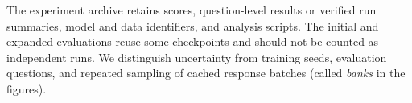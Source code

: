\begin{table}[t]
\caption{\textbf{All eight I64-minus-PG intervals include zero.} Update-500 score differences and nominal 95\% paired question-bootstrap intervals (percentage points).}
\label{tab:endpoint_paired}
\centering\small

\end{table}

The experiment archive retains scores, question-level results or verified run summaries, model and data identifiers, and analysis scripts. The initial and expanded evaluations reuse some checkpoints and should not be counted as independent runs. We distinguish uncertainty from training seeds, evaluation questions, and repeated sampling of cached response batches (called \emph{banks} in the figures).
